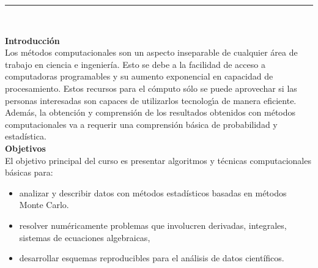 \documentclass[letterpaper,10pt,onecolumn]{article}
\begin{document}





\noindent\rule{\textwidth}{1pt}\\[-0.1cm]

\addtocounter{mysection}{1}

\noindent\textbf{\large {} \quad Introducci\'on}\\[-0.2cm]


\noindent\normalsize Los m\'etodos computacionales son un aspecto
inseparable de cualquier \'area de trabajo en ciencia e ingenier\'ia.
Esto se debe a la facilidad de acceso a 
computadoras programables  y su aumento exponencial en capacidad de
procesamiento.
Estos recursos para el c\'omputo s\'olo se puede aprovechar si las
personas interesadas son capaces de utilizarlos tecnolog\'{\i}a
de manera eficiente.
Adem\'as, la obtenci\'on y comprensi\'on de los resultados obtenidos
con m\'etodos computacionales va a requerir una comprensi\'on b\'asica
de probabilidad y estad\'istica. 
\\[0.1cm] 

\noindent\textbf{\large {} \quad Objetivos}\\[-0.2cm]

\noindent\normalsize El objetivo principal del curso es presentar
algoritmos y t\'ecnicas computacionales b\'asicas para:

\begin{itemize}
\item analizar y describir datos con m\'etodos estad\'isticos basadas
  en m\'etodos Monte Carlo. \\[-0.6cm]
\item resolver num\'ericamente problemas que involucren derivadas, integrales, sistemas de ecuaciones algebraicas, \\[-0.6cm]
\item desarrollar esquemas reproducibles para el an\'alisis de datos cient\'ificos. \\[-0.6cm]
\end{itemize} 
\vspace*{0.5cm} 
\end{document}
